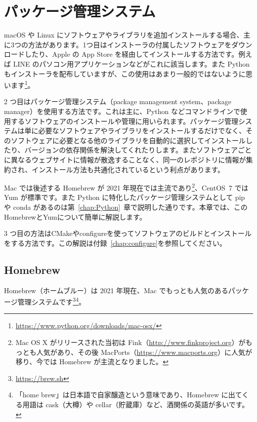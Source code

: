\setcounter{chapter}{0}
\renewcommand{\thechapter}{\Alph{chapter}}
\setcounter{equation}{0}
\renewcommand{\theequation}{\Alph{chapter}.\arabic{equation}}
\setcounter{figure}{0}
\renewcommand{\thefigure}{\Alph{chapter}.\arabic{figure}}
\setcounter{table}{0}
\renewcommand{\thetable}{\Alph{chapter}.\arabic{table}}
\appendix

\chapter{パッケージ管理システム}
\label{chap:package}
macOS や Linux にソフトウェアやライブラリを追加インストールする場合、主に3つの方法があります。1つ目はインストーラの付属したソフトウェアをダウンロードしたり、Apple の App Store を経由してインストールする方法です。例えば LINE のパソコン用アプリケーションなどがこれに該当します。また Python もインストーラを配布していますが、この使用はあまり一般的ではないように思います\footnote{\url{https://www.python.org/downloads/mac-osx/}}。

2 つ目はパッケージ管理システム（package management system、package manager）を使用する方法です。これは主に、Python などコマンドラインで使用するソフトウェアのインストールや管理に用いられます。パッケージ管理システムは単に必要なソフトウェアやライブラリをインストールするだけでなく、そのソフトウェアに必要となる他のライブラリを自動的に選択してインストールしたり、バージョンの依存関係を解決してくれたりします。またソフトウェアごとに異なるウェブサイトに情報が散逸することなく、同一のレポジトリに情報が集約され、インストール方法も共通化されているという利点があります。

Mac では後述する Homebrew が 2021 年現在では主流であり\footnote{Mac OS X がリリースされた当初は Fink（\url{http://www.finkproject.org}）がもっとも人気があり、その後 MacPorts（\url{https://www.macports.org}）に人気が移り、今では Homebrew が主流となりました。}、CentOS~7 では Yum が標準です。また Python に特化したパッケージ管理システムとして pip や conda があるのは第~\ref{chap:Python}~章で説明した通りです。本章では、このHomebrewとYumについて簡単に解説します。

3 つ目の方法はCMakeやconfigureを使ってソフトウェアのビルドとインストールをする方法です。この解説は付録~\ref{chap:configure}を参照してください。

\section{Homebrew}
\label{sec:Homebrew}
Homebrew（ホームブルー）は 2021 年現在、Mac でもっとも人気のあるパッケージ管理システムです\footnote{\url{https://brew.sh}}\footnote{「home brew」は日本語で自家醸造という意味であり、Homebrew に出てくる用語は cask（大樽）や cellar（貯蔵庫）など、酒関係の英語が多いです。}。

